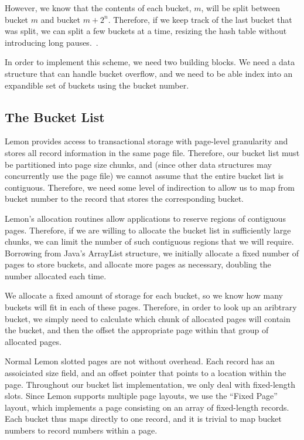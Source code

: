 \documentclass[letterpaper,twocolumn,english]{article}
\newcommand{\yad}{Lemon\xspace}
\begin{document}
However, 
we know that the
contents of each bucket, $m$, will be split between bucket $m$ and
bucket $m+2^{n}$. Therefore, if we keep track of the last bucket that
was split, we can split a few buckets at a time, resizing the hash
table without introducing long pauses.~\cite{lht}. 

In order to implement this scheme, we need two building blocks.  We
need a data structure that can handle bucket overflow, and we need to
be able index into an expandible set of buckets using the bucket
number.

\subsection{The Bucket List}

\yad provides access to transactional storage with page-level
granularity and stores all record information in the same page file.
Therefore, our bucket list must be partitioned into page size chunks,
and (since other data structures may concurrently use the page file)
we cannot assume that the entire bucket list is contiguous.
Therefore, we need some level of indirection to allow us to map from
bucket number to the record that stores the corresponding bucket.

\yad's allocation routines allow applications to reserve regions of
contiguous pages.  Therefore, if we are willing to allocate the bucket
list in sufficiently large chunks, we can limit the number of such
contiguous regions that we will require.  Borrowing from Java's
ArrayList structure, we initially allocate a fixed number of pages to
store buckets, and allocate more pages as necessary, doubling the
number allocated each time.  

We allocate a fixed amount of storage for each bucket, so we know how
many buckets will fit in each of these pages.  Therefore, in order to
look up an aribtrary bucket, we simply need to calculate which chunk
of allocated pages will contain the bucket, and then the offset the
appropriate page within that group of allocated pages.  


Normal \yad slotted pages are not without overhead.  Each record has
an assoiciated size field, and an offset pointer that points to a
location within the page.  Throughout our bucket list implementation,
we only deal with fixed-length slots.  Since \yad supports multiple
page layouts, we use the ``Fixed Page'' layout, which implements a
page consisting on an array of fixed-length records.  Each bucket thus
maps directly to one record, and it is trivial to map bucket numbers
to record numbers within a page.  
\end{document}
